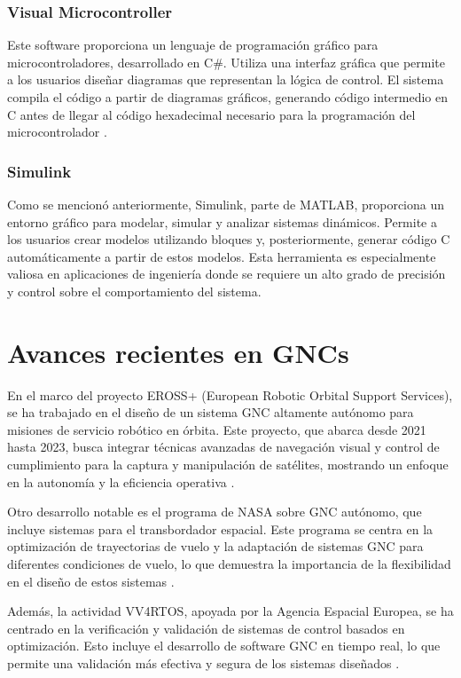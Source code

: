 \subsubsection{Visual Microcontroller}
Este software proporciona un lenguaje de programación gráfico para microcontroladores, desarrollado en C\#. Utiliza una interfaz gráfica que permite a los 
usuarios diseñar diagramas que representan la lógica de control. El sistema compila el código a partir de diagramas gráficos, generando código intermedio 
en C antes de llegar al código hexadecimal necesario para la programación del microcontrolador \cite{Sacta2011DesarrolloDU}.

\subsubsection{Simulink}
Como se mencionó anteriormente, Simulink, parte de MATLAB, proporciona un entorno gráfico para modelar, simular y analizar sistemas dinámicos. 
Permite a los usuarios crear modelos utilizando bloques y, posteriormente, generar código C automáticamente a partir de estos modelos. Esta 
herramienta es especialmente valiosa en aplicaciones de ingeniería donde se requiere un alto grado de precisión y control sobre el 
comportamiento del sistema.

\section{Avances recientes en GNCs }

En el marco del proyecto EROSS+ (European Robotic Orbital Support Services), se ha trabajado en el diseño de un sistema GNC altamente autónomo 
para misiones de servicio robótico en órbita. Este proyecto, que abarca desde 2021 hasta 2023, busca integrar técnicas avanzadas de navegación 
visual y control de cumplimiento para la captura y manipulación de satélites, mostrando un enfoque en la autonomía y la eficiencia operativa \cite{Casu2023EROSSPA}.

Otro desarrollo notable es el programa de NASA sobre GNC autónomo, que incluye sistemas para el transbordador espacial. Este programa se centra en la optimización 
de trayectorias de vuelo y la adaptación de sistemas GNC para diferentes condiciones de vuelo, lo que demuestra la importancia de la flexibilidad en el diseño de 
estos sistemas \cite{Bordano1991AutonomousGN}.

Además, la actividad VV4RTOS, apoyada por la Agencia Espacial Europea, se ha centrado en la verificación y validación de sistemas de control basados en optimización. 
Esto incluye el desarrollo de software GNC en tiempo real, lo que permite una validación más efectiva y segura de los sistemas diseñados \cite{Loureno2023VerificationV}.


